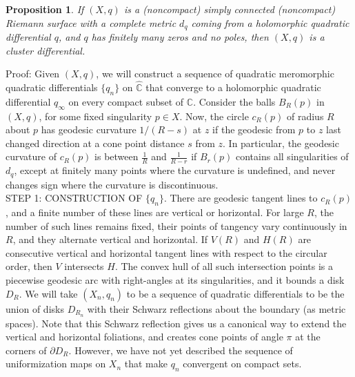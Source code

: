 \documentclass[12pt]{article}
\newtheorem{proposition}[theorem]{Proposition}
\newcommand{\cc}{\mathbb{C}}
\begin{document}
\begin{proposition}\label{PropEverythingIsCluster}If $(X,q)$ is a (noncompact) simply connected (noncompact) Riemann surface with a complete metric $d_q$ coming from a holomorphic quadratic differential $q$, and $q$ has finitely many zeros and no poles, then $(X,q)$ is a cluster differential. \end{proposition}

\noindent Proof: Given $(X,q)$, we will construct a sequence of quadratic meromorphic quadratic differentials $\{q_n\}$ on $\hat{\cc}$ that converge to a holomorphic quadratic differential $q_\infty$ on every compact subset of $\cc$. Consider the balls $B_R(p)$ in $(X,q)$, for some fixed singularity $p \in X$. Now, the circle $c_R(p)$ of radius $R$ about $p$ has geodesic curvature $1/(R-s)$ at $z$ if the geodesic from $p$ to $z$ last changed direction at a cone point distance $s$ from $z$. In particular, the geodesic curvature of $c_R(p)$ is between $\frac{1}{R}$ and $\frac{1}{R-r}$ if $B_r(p)$ contains all singularities of $d_q$, except at finitely many points where the curvature is undefined, and never changes sign where the curvature is discontinuous.\\

\noindent STEP 1: CONSTRUCTION OF $\{q_n\}$. There are geodesic tangent lines to $c_R(p)$, and a finite number of these lines are vertical or horizontal. For large $R$, the number of such lines remains fixed, their points of tangency vary continuously in $R$, and they alternate vertical and horizontal. If $V(R)$ and $H(R)$ are consecutive vertical and horizontal tangent lines with respect to the circular order, then $V$ intersects $H$. The convex hull of all such intersection points is a piecewise geodesic arc with right-angles at its singularities, and it bounds a disk $D_R$. We will take $(X_n,q_n)$ to be a sequence of quadratic differentials to be the union of disks $D_{R_n}$ with their Schwarz reflections about the boundary (as metric spaces). Note that this Schwarz reflection gives us a canonical way to extend the vertical and horizontal foliations, and creates cone points of angle $\pi$ at the corners of $\partial D_R$. However, we have not yet described the sequence of uniformization maps on $X_n$ that make $q_n$ convergent on compact sets.\\
\end{document}
